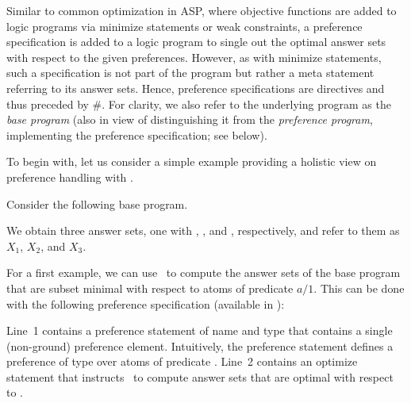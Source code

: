 Similar to common optimization in ASP,
where objective functions are added to logic programs
via minimize statements or weak constraints,
a preference specification is added to a logic program
to single out the optimal answer sets with respect to the given preferences.
However, as with minimize statements,
such a specification is not part of the program
but rather a meta statement referring to its answer sets.
Hence, preference specifications are directives and thus preceded by \#.
For clarity, we also refer to the underlying program as the \emph{base program}
(also in view of distinguishing it from the \emph{preference program},
implementing the preference specification; see below).

To begin with,
let us consider a simple example providing a holistic view on preference handling with \asprin.
%
\begin{example}\label{asprin:example1}
Consider the following base program.
%

%
We obtain three answer sets, one with , , and , respectively,
and refer to them as $X_1$, $X_2$, and $X_3$.

For a first example,
we can use \asprin\ to compute the answer sets of the base program that are subset minimal with respect to atoms of predicate $a/1$. 
This can be done with the following preference specification 
(available in ): 
%

%
Line~1 contains a preference statement of name  and type  that contains a single (non-ground) preference element.
Intuitively, the preference statement  defines a preference of type  over atoms of predicate . 
Line~2 contains an optimize statement that instructs \asprin\ to compute answer sets that are optimal with respect to . 


\end{example}
